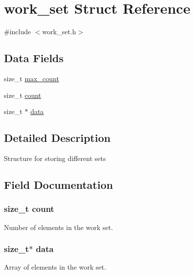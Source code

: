 \hypertarget{structwork__set}{}\section{work\+\_\+set Struct Reference}
\label{structwork__set}


{\ttfamily \#include $<$work\+\_\+set.\+h$>$}

\subsection*{Data Fields}
\begin{DoxyCompactItemize}
\item 
size\+\_\+t \hyperlink{structwork__set_acc1d5d6a690bac67f3439e3265a05694}{max\+\_\+count}
\item 
size\+\_\+t \hyperlink{structwork__set_a76d971a3c552bc58ba9f0d5fceae9806}{count}
\item 
size\+\_\+t $\ast$ \hyperlink{structwork__set_adb04825e910a0d40a43fe600dff0e779}{data}
\end{DoxyCompactItemize}


\subsection{Detailed Description}
Structure for storing different sets 

\subsection{Field Documentation}
\hypertarget{structwork__set_a76d971a3c552bc58ba9f0d5fceae9806}{}
\subsubsection[{count}]{\setlength{\rightskip}{0pt plus 5cm}size\+\_\+t count}\label{structwork__set_a76d971a3c552bc58ba9f0d5fceae9806}
Number of elements in the work set. \hypertarget{structwork__set_adb04825e910a0d40a43fe600dff0e779}{}
\subsubsection[{data}]{\setlength{\rightskip}{0pt plus 5cm}size\+\_\+t$\ast$ data}\label{structwork__set_adb04825e910a0d40a43fe600dff0e779}
Array of elements in the work set. \hypertarget{structwork__set_acc1d5d6a690bac67f3439e3265a05694}{}
